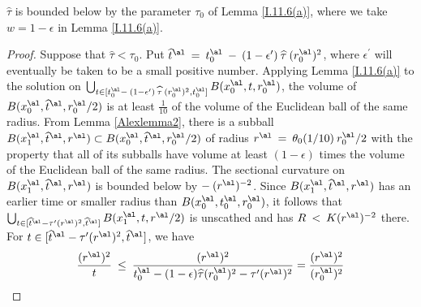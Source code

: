 \begin{lemma}
  \label{lem:kl-earlier-scalar-curvature-bounds-smaller-balls-from-lower-curvature-bound-estimates-scalar-curvature-8}

$\widehat{\tau}$ is bounded below by the parameter
$\tau_0$ of Lemma \ref{I.11.6(a)}, where we take $w = 1-\epsilon$ in
Lemma \ref{I.11.6(a)}.
\end{lemma}
\begin{proof}
Suppose that $\widehat{\tau} < \tau_0$.
Put $\widehat{t}^\al \: = \: t_0^\al \: - \: (1 - \epsilon^\prime) \:
\widehat{\tau} \: (r_0^\al)^2$, where $\epsilon^\prime$ will eventually be
taken to be a small positive number. Applying Lemma \ref{I.11.6(a)} to the
solution on $\bigcup_{t \in [t_0^\al - \: (1 - \epsilon^\prime) \:
\widehat{\tau} \: (r_0^\al)^2, t_0^\al]} B(x_0^\al, t, r_0^\al)$,
the volume
of $B(x_0^\al, \widehat{t}^\al, r_0^\al/2)$ is at least $\frac{1}{10}$ of the
volume of the Euclidean ball of the same radius.
From Lemma \ref{Alexlemma2}, there is a subball
$B(x_1^\al, \widehat{t}^\al, r^\al)
\subset
B(x_0^\al, \widehat{t}^\al, r_0^\al/2)$ of radius $r^\al \: = \:
\theta_0(1/10) \: r_0^\al/2$
with the property that all of its subballs have volume at least
$(1-\epsilon)$ times the volume of the Euclidean ball of the same radius.
The sectional curvature on $B(x_1^\al, \widehat{t}^\al, r^\al)$
is bounded below by
$- \: (r^\al)^{-2}$.
Since $B(x_1^\al, \widehat{t}^\al, r^\al)$ has an
earlier time or smaller radius
than $B(x_0^\al, t_0^\al, r_0^\al)$, it
follows that $\bigcup_{t \in [\widehat{t}^\al - \tau^\prime (r^\al)^2,
\widehat{t}^\al]} B(x_1^\al, t, r^\al/2)$
is unscathed and has $R \: < \: K (r^\al)^{-2}$ there.
For $t \in [\widehat{t}^\al - \tau^\prime (r^\al)^2,
\widehat{t}^\al]$, we have
\begin{equation}
\frac{(r^\al)^2}{t} \: \le \:
\frac{(r^\al)^2}{t_0^\al - (1-\epsilon) \widehat{\tau} (r_0^\al)^2 -
\tau^\prime (r^\al)^2} =
\frac{(r^\al)^2}{(r_0^\al)^2}

\end{equation}
\end{proof}
